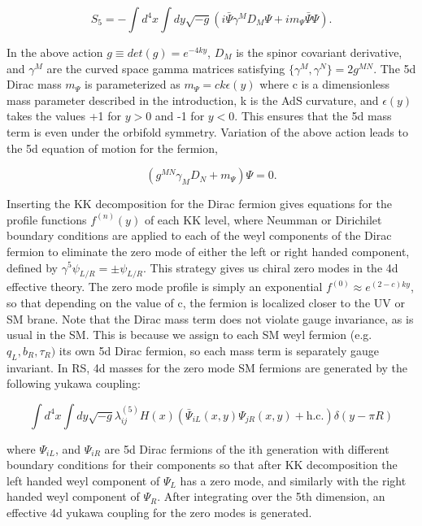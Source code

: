 \documentclass[aps,onecolumn,twoside,secnumarabic,balancelastpage,amsmath,amssymb,nofootinbib,hyperref=pdftex]{revtex4}
\begin{document}
\begin{equation}
S_{5} = -\int d^{4}x\int dy \sqrt{-g} (i\bar{\Psi}\gamma^{M}D_{M}\Psi + im_{\Psi}\bar{\Psi}\Psi).
\end{equation}

In the above action $g\equiv det(g) = e^{-4ky}$, $D_{M}$ is the spinor covariant derivative, and $\gamma^{M}$ are the curved space gamma matrices satisfying $\{\gamma^{M},\gamma^{N}\} = 2g^{MN}$. The 5d Dirac mass $m_{\Psi}$ is parameterized as $m_{\Psi} = ck\epsilon(y)$ where c is a dimensionless mass parameter described in the introduction, k is the AdS curvature, and $\epsilon(y)$ takes the values +1 for $y > 0$ and -1 for $y < 0$. This ensures that the 5d mass term is even under the orbifold symmetry. 
\vskip 0.12in
Variation of the above action leads to the 5d equation of motion for the fermion,

\begin{equation}
(g^{MN}\gamma_{M}D_{N} + m_{\Psi})\Psi = 0.
\end{equation}

Inserting the KK decomposition for the Dirac fermion gives equations for the profile functions $f^{(n)}(y)$ of each KK level, where Neumman or Dirichilet boundary conditions are applied to each of the weyl components of the Dirac fermion to eliminate the zero mode of either the left or right handed component, defined by $\gamma^{5}\psi_{L/R} = \pm\psi_{L/R}$. This strategy gives us chiral zero modes in the 4d effective theory. The zero mode profile is simply an exponential $f^{(0)} \approx e^{(2-c)ky}$, so that depending on the value of c, the fermion is localized closer to the UV or SM brane. Note that the Dirac mass term does not violate gauge invariance, as is usual in the SM. This is because we assign to each SM weyl fermion (e.g. $q_{L}, b_{R}, \tau_{R})$ its own 5d Dirac fermion, so each mass term is separately gauge invariant.
\vskip 0.12in
In RS, 4d masses for the zero mode SM fermions are generated by the following yukawa coupling:

\begin{equation}
\int d^{4}x\int dy\sqrt{-g} \lambda^{(5)}_{ij}H(x)(\bar{\Psi}_{iL}(x,y)\Psi_{jR}(x,y) + \text{h.c.})\delta(y - \pi R)
\end{equation}

where $\Psi_{iL}$, and $\Psi_{iR}$ are 5d Dirac fermions of the ith generation with different boundary conditions for their components so that after KK decomposition the left handed weyl component of $\Psi_{L}$ has a zero mode, and similarly with the right handed weyl component of $\Psi_{R}$. After integrating over the 5th dimension, an effective 4d yukawa coupling for the zero modes is generated.
\end{document}
